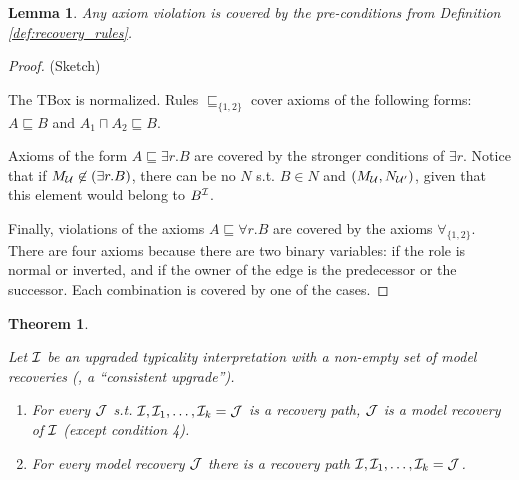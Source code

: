 \documentclass[draft]{article}
\newtheorem{lemma}[definition]{Lemma}
\newtheorem{theorem}[definition]{Theorem}
\begin{document}
\begin{lemma}
  Any axiom violation is covered by the pre-conditions from Definition \ref{def:recovery_rules}.
\end{lemma}

\begin{proof}
  (Sketch)

  The TBox is normalized. Rules $\sqsubseteq_{\{1,2\}}$ cover axioms of the following forms: $A \sqsubseteq B$ and $A_1 \sqcap A_2 \sqsubseteq B$.

  Axioms of the form $A \sqsubseteq \exists r.B$ are covered by the stronger conditions of $\exists r$. 
  Notice that if ${M}_{\mathcal{U}} \not \in (\exists r.B)$, there can be no $N$ s.t. $B \in N$ and $({M}_{\mathcal{U}}, {N}_{\mathcal{U}'})$, given that this element would belong to $B^{\mathcal{I}}$.

  Finally, violations of the axioms $A \sqsubseteq \forall r.B$ are covered by the axioms $\forall_{\{1, 2\}}$.
  There are four axioms because there are two binary variables: if the role is normal or inverted, and if the owner of the edge is the predecessor or the successor.
  Each combination is covered by one of the cases.
\end{proof}

\begin{theorem}
\label{thm:equivalence}

Let $\mathcal{I}$ be an upgraded typicality interpretation with a non-empty set of model recoveries (\ie, a ``consistent upgrade'').

\begin{enumerate}
  \item For every $\mathcal{J}$ s.t. $\mathcal{I}, \mathcal{I}_1, \dots, \mathcal{I}_k = \mathcal{J}$ is a recovery path, $\mathcal{J}$ is a model recovery of $\mathcal{I}$ (except condition 4).
  \item For every model recovery $\mathcal{J}$ there is a recovery path $\mathcal{I}, \mathcal{I}_1, \dots, \mathcal{I}_k = \mathcal{J}$. 
\end{enumerate}
\end{theorem}
\end{document}
